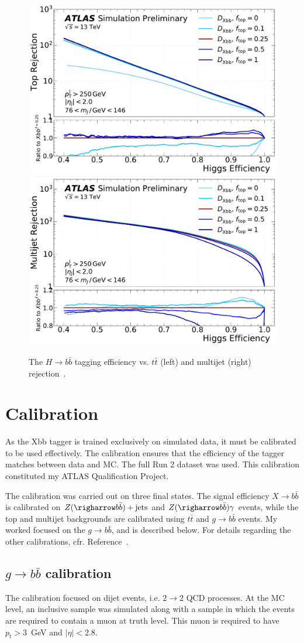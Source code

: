 \documentclass[10pt,a4paper]{book}
\begin{document}
\begin{figure}
    \centering
    \includegraphics[width=0.485\linewidth]{ftag/xbb_ttbar_eff.pdf}
    \includegraphics[width=0.485\linewidth]{ftag/xbb_multijet_eff.pdf}
    \caption{The $H\rightarrow b\bar{b}$ tagging efficiency vs. $t\bar{t}$ (left) and multijet (right) rejection~\cite{ATLAS:2021gik}.}
    \label{fig:xbb_eff}
\end{figure}

\section{Calibration}

As the Xbb tagger is trained exclusively on simulated data, it must be calibrated to be used effectively. The calibration ensures that the efficiency of the tagger matches between data and MC. The full Run 2 dataset was used. This calibration constituted my ATLAS Qualification Project.

The calibration was carried out on three final states. The signal efficiency $X\rightarrow b\bar{b}$ is calibrated on $Z (\righarrow b\bar{b}) + \text{jets}$ and $Z(\righarrow b\bar{b})\gamma$ events, while the top and multijet backgrounds are calibrated using $t\bar{t}$ and $g\rightarrow b\bar{b}$ events. My worked focused on the $g\rightarrow b\bar{b}$, and is described below. For details regarding the other calibrations, cfr. Reference~\cite{ATLAS:2021gik}.

\subsection{$g\rightarrow b\bar{b}$ calibration}
\label{gbb}
The calibration focused on dijet events, i.e. $2 \rightarrow 2$ QCD processes. At the MC level, an inclusive sample was simulated along with a sample in which the events are required to contain a muon at truth level. This muon is required to have $p_t > 3$~GeV and $\vert \eta \vert < 2.8$. 
\end{document}
